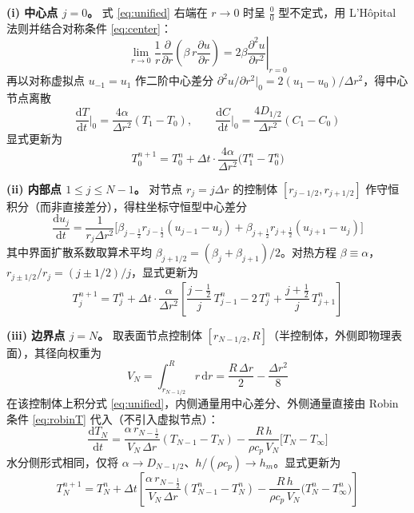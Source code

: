 \documentclass[12pt,a4paper]{ctexart}
\newcommand{\dd}{\mathrm{d}}
\begin{document}
\textbf{(i) 中心点 $j=0$。} 式 \eqref{eq:unified} 右端在 $r\to0$ 时呈 $\tfrac00$ 型不定式，用 L'H\^opital 法则并结合对称条件 \eqref{eq:center}：
\begin{equation}
\lim_{r\to0}\frac{1}{r}\frac{\partial}{\partial r}\!\left(\beta\,r\frac{\partial u}{\partial r}\right)
=2\beta\left.\frac{\partial^2 u}{\partial r^2}\right|_{r=0}
\label{eq:lhopital}
\end{equation}
再以对称虚拟点 $u_{-1}=u_1$ 作二阶中心差分 $\partial^2u/\partial r^2|_0=2(u_1-u_0)/\Delta r^2$，得中心节点离散
\begin{equation}
\frac{\dd T}{\dd t}\Big|_0=\frac{4\alpha}{\Delta r^2}(T_1-T_0),\qquad
\frac{\dd C}{\dd t}\Big|_0=\frac{4D_{1/2}}{\Delta r^2}(C_1-C_0)
\label{eq:center_disc}
\end{equation}
显式更新为
\begin{equation}
T_0^{n+1}=T_0^{n}+\Delta t\cdot\frac{4\alpha}{\Delta r^2}\big(T_1^n-T_0^n\big)
\label{eq:center_explicit}
\end{equation}

\textbf{(ii) 内部点 $1\le j\le N-1$。} 对节点 $r_j=j\Delta r$ 的控制体 $[r_{j-1/2},r_{j+1/2}]$ 作守恒积分（而非直接差分），得柱坐标守恒型中心差分
\begin{equation}
\frac{\dd u_j}{\dd t}=\frac{1}{r_j\Delta r^2}\Big[\beta_{j-\frac12}r_{j-\frac12}(u_{j-1}-u_j)+\beta_{j+\frac12}r_{j+\frac12}(u_{j+1}-u_j)\Big]
\label{eq:interior_disc}
\end{equation}
其中界面扩散系数取算术平均 $\beta_{j+1/2}=(\beta_j+\beta_{j+1})/2$。对热方程 $\beta\equiv\alpha$，$r_{j\pm1/2}/r_j=(j\pm1/2)/j$，显式更新为
\begin{equation}
T_j^{n+1}=T_j^{n}+\Delta t\cdot\frac{\alpha}{\Delta r^2}
\left[\frac{j-\tfrac12}{j}\,T_{j-1}^n-2\,T_j^n+\frac{j+\tfrac12}{j}\,T_{j+1}^n\right]
\label{eq:interior_explicit}
\end{equation}

\textbf{(iii) 边界点 $j=N$。} 取表面节点控制体 $[r_{N-1/2},R]$（半控制体，外侧即物理表面），其径向权重为
\begin{equation}
V_N=\int_{r_{N-1/2}}^{R}r\,\dd r=\frac{R\,\Delta r}{2}-\frac{\Delta r^2}{8}
\label{eq:VN}
\end{equation}
在该控制体上积分式 \eqref{eq:unified}，内侧通量用中心差分、外侧通量直接由 Robin 条件 \eqref{eq:robinT} 代入（不引入虚拟节点）：
\begin{equation}
\frac{\dd T_N}{\dd t}=
\frac{\alpha\,r_{N-\frac12}}{V_N\,\Delta r}(T_{N-1}-T_N)
-\frac{R\,h}{\rho c_p\,V_N}\big[T_N-T_\infty\big]
\label{eq:boundary_disc}
\end{equation}
水分侧形式相同，仅将 $\alpha\to D_{N-1/2}$、$h/(\rho c_p)\to h_m$。显式更新为
\begin{equation}
T_N^{n+1}=T_N^{n}+\Delta t\left[
\frac{\alpha\,r_{N-\frac12}}{V_N\,\Delta r}(T_{N-1}^n-T_N^n)
-\frac{R\,h}{\rho c_p\,V_N}\big(T_N^n-T_\infty^n\big)\right]
\label{eq:boundary_explicit}
\end{equation}
\end{document}
